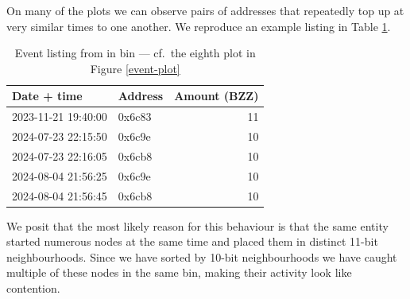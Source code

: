 On many of the plots we can observe pairs of addresses that repeatedly top up at very similar times to one another.
%
We reproduce an example listing in Table \ref{event-listing}.
%
\begin{table}
  \centering
  \begin{tabular}{llr}
    \toprule
    Date + time         & Address & Amount (BZZ) \\
    \midrule
    2023-11-21 19:40:00 & 0x6c83 &   11 \\
    2024-07-23 22:15:50 &	0x6c9e  &	10 \\
    2024-07-23 22:16:05 &	0x6cb8  &	10 \\
    2024-08-04 21:56:25 &	0x6c9e  &	10 \\
    2024-08-04 21:56:45 &	0x6cb8  &	10 \\
    \bottomrule
  \end{tabular}
  \caption{Event listing from in bin  --- cf.~the eighth plot in Figure \ref{event-plot}}
  \label{event-listing}
\end{table}
%
We posit that the most likely reason for this behaviour is that the same entity started numerous nodes at the same time and placed them in distinct 11-bit neighbourhoods.
%
Since we have sorted by 10-bit neighbourhoods we have caught multiple of these nodes in the same bin, making their activity look like contention.